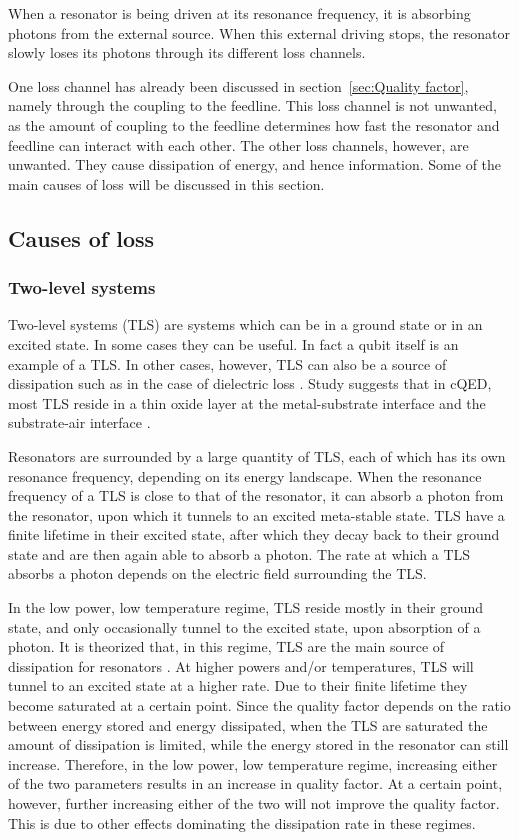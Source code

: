 \documentclass[12pt]{report}
\begin{document}
When a resonator is being driven at its resonance frequency, it is absorbing photons from the external source. When this external driving stops, the resonator slowly loses its photons through its different loss channels.

One loss channel has already been discussed in section~\ref{sec:Quality factor}, namely through the coupling to the feedline. This loss channel is not unwanted, as the amount of coupling to the feedline determines how fast the resonator and feedline can interact with each other. The other loss channels, however, are unwanted. They cause dissipation of energy, and hence information. Some of the main causes of loss will be discussed in this section.


\subsection{Causes of loss}

\subsubsection{Two-level systems}
\label{sec:TLS}

Two-level systems (TLS) are systems which can be in a ground state or in an excited state. In some cases they can be useful. In fact a qubit itself is an example of a TLS. In other cases, however, TLS can also be a source of dissipation such as in the case of dielectric loss \cite{martinis2014ucsb}. Study suggests that in cQED, most TLS reside in a thin oxide layer at the metal-substrate interface and the substrate-air interface \cite{wenner2011surface}.

Resonators are surrounded by a large quantity of TLS, each of which has its own resonance frequency, depending on its energy landscape. When the resonance frequency of a TLS is close to that of the resonator, it can absorb a photon from the resonator, upon which it tunnels to an excited meta-stable state. TLS have a finite lifetime in their excited state, after which they decay back to their ground state and are then again able to absorb a photon. The rate at which a TLS absorbs a photon depends on the electric field surrounding the TLS.

In the low power, low temperature regime, TLS reside mostly in their ground state, and only occasionally tunnel to the excited state, upon absorption of a photon. It is theorized that, in this regime, TLS are the main source of dissipation for resonators \cite{gao2008experimental}. At higher powers and/or temperatures, TLS will tunnel to an excited state at a higher rate. Due to their finite lifetime they become saturated at a certain point. Since the quality factor depends on the ratio between energy stored and energy dissipated, when the TLS are saturated the amount of dissipation is limited, while the energy stored in the resonator can still increase. Therefore, in the low power, low temperature regime, increasing either of the two parameters results in an increase in quality factor. At a certain point, however, further increasing either of the two will not improve the quality factor. This is due to other effects dominating the dissipation rate in these regimes.
\end{document}
